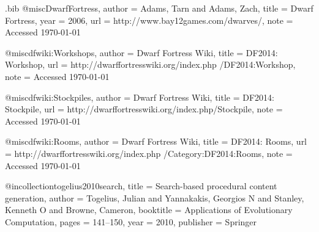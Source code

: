 \begin{filecontents*}{\jobname.bib}
@misc{DwarfFortress,
	author 	= {Adams, Tarn and Adams, Zach},
	title 		= {{D}warf {F}ortress},
	year 		= {2006}, 
	url 		= {http://www.bay12games.com/dwarves/},
	note		= {Accessed \today}
}

@misc{dfwiki:Workshops,
	author 	= {Dwarf Fortress Wiki},
	title 		= {{D}{F}2014: {W}orkshop},
	url 		= {http://dwarffortresswiki.org/index.php /DF2014:Workshop},
	note		= {Accessed \today}
}

@misc{dfwiki:Stockpiles,
	author 	= {Dwarf Fortress Wiki},
	title 		= {{D}{F}2014: {S}tockpile},
	url 		= {http://dwarffortresswiki.org/index.php/Stockpile},
	note		= {Accessed \today}
}

@misc{dfwiki:Rooms,
	author 	= {Dwarf Fortress Wiki},
	title 		= {{D}{F}2014: {R}ooms},
	url 		= {http://dwarffortresswiki.org/index.php /Category:DF2014:Rooms},
	note		= {Accessed \today}
}

@incollection{togelius2010search,
	title		= {{S}earch-based procedural content generation},
	author	= {Togelius, Julian and Yannakakis, Georgios N and Stanley, Kenneth O and Browne, Cameron},
	booktitle	= {Applications of Evolutionary Computation},
	pages		= {141--150},
	year		= {2010},
	publisher	= {Springer}
}

\end{filecontents*}

